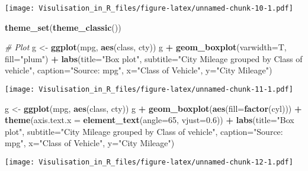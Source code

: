 \documentclass[]{article}
\newenvironment{Shaded}{\begin{snugshade}}{\end{snugshade}}
\newcommand{\KeywordTok}[1]{\textcolor[rgb]{0.13,0.29,0.53}{\textbf{#1}}}
\newcommand{\DataTypeTok}[1]{\textcolor[rgb]{0.13,0.29,0.53}{#1}}
\newcommand{\DecValTok}[1]{\textcolor[rgb]{0.00,0.00,0.81}{#1}}
\newcommand{\FloatTok}[1]{\textcolor[rgb]{0.00,0.00,0.81}{#1}}
\newcommand{\StringTok}[1]{\textcolor[rgb]{0.31,0.60,0.02}{#1}}
\newcommand{\CommentTok}[1]{\textcolor[rgb]{0.56,0.35,0.01}{\textit{#1}}}
\newcommand{\OperatorTok}[1]{\textcolor[rgb]{0.81,0.36,0.00}{\textbf{#1}}}
\newcommand{\NormalTok}[1]{#1}
\begin{document}
\texttt{[image: Visulisation\_in\_R\_files/figure-latex/unnamed-chunk-10-1.pdf]}

\begin{Shaded}
\begin{Highlighting}[]
\KeywordTok{theme_set}\NormalTok{(}\KeywordTok{theme_classic}\NormalTok{())}

\CommentTok{# Plot}
\NormalTok{g <-}\StringTok{ }\KeywordTok{ggplot}\NormalTok{(mpg, }\KeywordTok{aes}\NormalTok{(class, cty))}
\NormalTok{g }\OperatorTok{+}\StringTok{ }\KeywordTok{geom_boxplot}\NormalTok{(}\DataTypeTok{varwidth=}\NormalTok{T, }\DataTypeTok{fill=}\StringTok{"plum"}\NormalTok{) }\OperatorTok{+}\StringTok{ }
\StringTok{    }\KeywordTok{labs}\NormalTok{(}\DataTypeTok{title=}\StringTok{"Box plot"}\NormalTok{, }
         \DataTypeTok{subtitle=}\StringTok{"City Mileage grouped by Class of vehicle"}\NormalTok{,}
         \DataTypeTok{caption=}\StringTok{"Source: mpg"}\NormalTok{,}
         \DataTypeTok{x=}\StringTok{"Class of Vehicle"}\NormalTok{,}
         \DataTypeTok{y=}\StringTok{"City Mileage"}\NormalTok{)}
\end{Highlighting}
\end{Shaded}

\texttt{[image: Visulisation\_in\_R\_files/figure-latex/unnamed-chunk-11-1.pdf]}

\begin{Shaded}
\begin{Highlighting}[]
\NormalTok{g <-}\StringTok{ }\KeywordTok{ggplot}\NormalTok{(mpg, }\KeywordTok{aes}\NormalTok{(class, cty))}
\NormalTok{g }\OperatorTok{+}\StringTok{ }\KeywordTok{geom_boxplot}\NormalTok{(}\KeywordTok{aes}\NormalTok{(}\DataTypeTok{fill=}\KeywordTok{factor}\NormalTok{(cyl))) }\OperatorTok{+}\StringTok{ }
\StringTok{  }\KeywordTok{theme}\NormalTok{(}\DataTypeTok{axis.text.x =} \KeywordTok{element_text}\NormalTok{(}\DataTypeTok{angle=}\DecValTok{65}\NormalTok{, }\DataTypeTok{vjust=}\FloatTok{0.6}\NormalTok{)) }\OperatorTok{+}\StringTok{ }
\StringTok{  }\KeywordTok{labs}\NormalTok{(}\DataTypeTok{title=}\StringTok{"Box plot"}\NormalTok{, }
       \DataTypeTok{subtitle=}\StringTok{"City Mileage grouped by Class of vehicle"}\NormalTok{,}
       \DataTypeTok{caption=}\StringTok{"Source: mpg"}\NormalTok{,}
       \DataTypeTok{x=}\StringTok{"Class of Vehicle"}\NormalTok{,}
       \DataTypeTok{y=}\StringTok{"City Mileage"}\NormalTok{)}
\end{Highlighting}
\end{Shaded}

\texttt{[image: Visulisation\_in\_R\_files/figure-latex/unnamed-chunk-12-1.pdf]}
\end{document}
